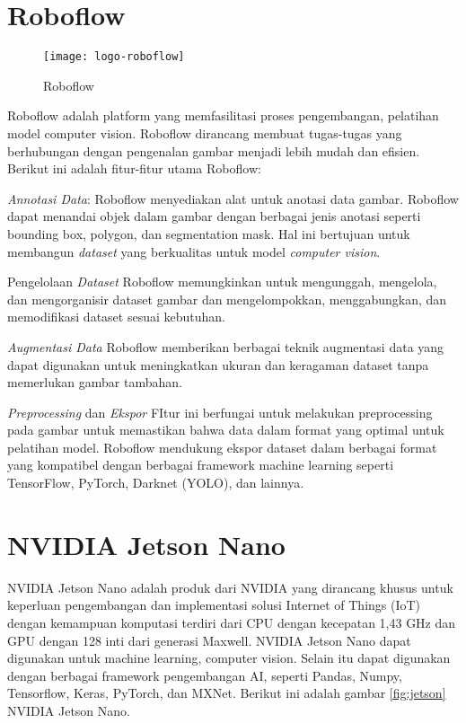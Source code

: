 \section{Roboflow}
\begin{figure}[H]
	\centering
	\texttt{[image: logo-roboflow]}
	\caption{Roboflow}
	\label{fig:roboflow}
	
\end{figure}
Roboflow adalah platform yang memfasilitasi proses pengembangan, pelatihan model computer vision. Roboflow dirancang membuat tugas-tugas yang berhubungan dengan pengenalan gambar menjadi lebih mudah dan efisien. Berikut ini adalah fitur-fitur utama Roboflow:
\begin{packed_item}
	\item \textit{Annotasi Data}: Roboflow menyediakan alat untuk anotasi data gambar. Roboflow dapat menandai objek dalam gambar dengan berbagai jenis anotasi seperti bounding box, polygon, dan segmentation mask. Hal ini bertujuan untuk membangun  \textit{dataset} yang berkualitas untuk model \textit{computer vision}.
	
	\item Pengelolaan \textit{Dataset}
	Roboflow memungkinkan untuk mengunggah, mengelola, dan mengorganisir dataset gambar dan mengelompokkan, menggabungkan, dan memodifikasi dataset sesuai kebutuhan.
	
	\item \textit{Augmentasi Data}
	Roboflow memberikan berbagai teknik augmentasi data yang dapat digunakan untuk meningkatkan ukuran dan keragaman dataset tanpa memerlukan gambar tambahan. 

	\item \textit{Preprocessing} dan \textit{Ekspor}
	FItur ini berfungai untuk melakukan preprocessing pada gambar untuk memastikan bahwa data dalam format yang optimal untuk pelatihan model. Roboflow mendukung ekspor dataset dalam berbagai format yang kompatibel dengan berbagai framework machine learning seperti TensorFlow, PyTorch, Darknet (YOLO), dan lainnya.
\end{packed_item}

\section{NVIDIA Jetson Nano}
NVIDIA Jetson Nano adalah produk dari NVIDIA yang dirancang khusus untuk keperluan pengembangan dan implementasi solusi Internet of Things (IoT) dengan kemampuan komputasi terdiri dari CPU dengan kecepatan 1,43 GHz dan GPU dengan 128 inti dari generasi Maxwell. NVIDIA Jetson Nano dapat digunakan untuk machine learning, computer vision. Selain itu dapat digunakan dengan berbagai framework pengembangan AI, seperti Pandas, Numpy, Tensorflow, Keras, PyTorch, dan MXNet. Berikut ini adalah gambar \cref{fig:jetson} NVIDIA Jetson Nano.

